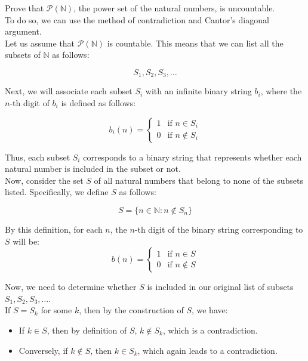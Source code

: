 \begin{example}
    Prove that \( \mathcal{P}(\mathbb{N}) \), the power set of the natural numbers, is uncountable. \\
    
    To do so, we can use the method of contradiction and Cantor's diagonal argument. \\

    Let us assume that \( \mathcal{P}(\mathbb{N}) \) is countable. This means that we can list all the subsets of \( \mathbb{N} \) as follows:
    
    \[
    S_1, S_2, S_3, \ldots
    \]
    
    Next, we will associate each subset \( S_i \) with an infinite binary string \( b_i \), where the \( n \)-th digit of \( b_i \) is defined as follows:
    
    \[
    b_i(n) = 
    \begin{cases} 
    1 & \text{if } n \in S_i \\ 
    0 & \text{if } n \notin S_i 
    \end{cases}
    \]
    
    Thus, each subset \( S_i \) corresponds to a binary string that represents whether each natural number is included in the subset or not. \\
    
    Now, consider the set \( S \) of all natural numbers that belong to none of the subsets listed. Specifically, we define \( S \) as follows:
    
    \[
    S = \{ n \in \mathbb{N} : n \notin S_n \}
    \]
    
    By this definition, for each \( n \), the \( n \)-th digit of the binary string corresponding to \( S \) will be: \\
    
    \[
    b(n) = 
    \begin{cases} 
    1 & \text{if } n \in S \\ 
    0 & \text{if } n \notin S 
    \end{cases}
    \]
    
    Now, we need to determine whether \( S \) is included in our original list of subsets \( S_1, S_2, S_3, \ldots \). \\

    If \( S = S_k \) for some \( k \), then by the construction of \( S \), we have:
    \begin{itemize}
        \item If \( k \in S \), then by definition of \( S \), \( k \notin S_k \), which is a contradiction.
        \item  Conversely, if \( k \notin S \), then \( k \in S_k \), which again leads to a contradiction.
    \end{itemize}
    

\end{example}
